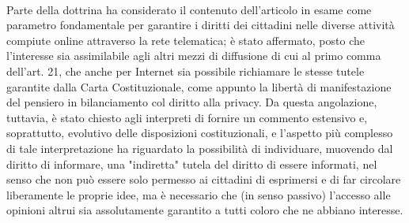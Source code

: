 \\Parte della dottrina ha considerato il contenuto dell'articolo in esame come parametro fondamentale per garantire i diritti dei cittadini nelle diverse attività compiute online attraverso la rete telematica; è stato affermato, posto che l'interesse sia assimilabile agli altri mezzi di diffusione di cui al primo comma dell'art. 21, che anche per Internet sia possibile richiamare le stesse tutele garantite dalla Carta Costituzionale, come appunto la libertà di manifestazione del pensiero in bilanciamento col diritto alla privacy. Da questa angolazione, tuttavia, è stato chiesto agli interpreti di fornire un commento estensivo e, soprattutto, evolutivo delle disposizioni costituzionali, e l'aspetto più complesso di tale interpretazione ha riguardato la possibilità di individuare, muovendo dal diritto di informare, una "indiretta" tutela del diritto di essere informati, nel senso che non può essere solo permesso ai cittadini di esprimersi e di far circolare liberamente le proprie idee, ma è necessario che (in senso passivo) l'accesso alle opinioni altrui sia assolutamente garantito a tutti coloro che ne abbiano interesse.

